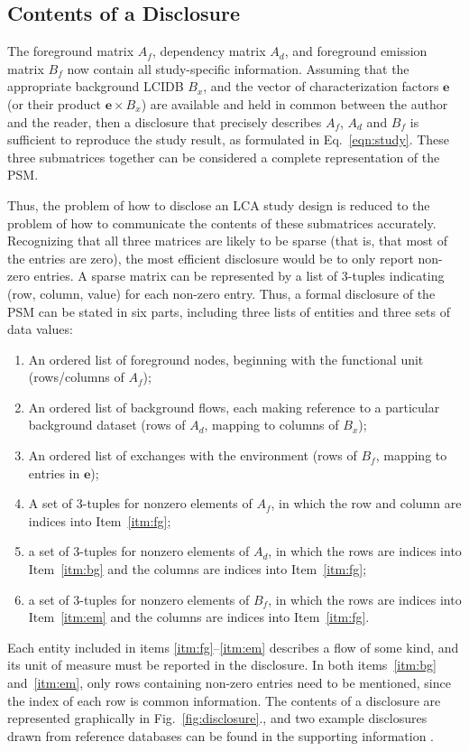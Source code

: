 \subsection{Contents of a Disclosure}

The foreground matrix $A_f$, dependency matrix $A_d$, and foreground emission matrix $B_f$ now contain all study-specific information.  Assuming that the appropriate background LCIDB $B_x$, and the vector of characterization factors $\mathbf{e}$ (or their product $\mathbf{e}\times B_x$) are available and held in common between the author and the reader, then a disclosure that precisely describes $A_f$, $A_d$ and $B_f$ is sufficient to reproduce the study result, as formulated in Eq.~\ref{eqn:study}.  These three submatrices together can be considered a complete representation of the PSM.


Thus, the problem of how to disclose an LCA study design is reduced to the problem of how to communicate the contents of these submatrices accurately.  Recognizing that all three matrices are likely to be sparse (that is, that most of the entries are zero), the most efficient disclosure would be to only report non-zero entries.  A sparse matrix can be represented by a list of 3-tuples indicating (row, column, value) for each non-zero entry.  Thus, a formal disclosure of the PSM can be stated in six parts, including three lists of entities and three sets of data values:
\begin{enumerate}[label={\em d-\roman*}., ref={\em d-\roman*}]
\item\label{itm:fg} An ordered list of foreground nodes, beginning with the functional unit (rows/columns of $A_f$);
\item\label{itm:bg} An ordered list of background flows, each making reference to a particular background dataset (rows of $A_d$, mapping to columns of $B_x$);
\item\label{itm:em} An ordered list of exchanges with the environment (rows of $B_f$, mapping to entries in $\mathbf{e}$);
\item\label{itm:af} A set of 3-tuples for nonzero elements of $A_f$, in which the row and column are indices into Item~\ref{itm:fg};
\item\label{itm:ad} a set of 3-tuples for nonzero elements of $A_d$, in which the rows are indices into Item~\ref{itm:bg} and the columns are indices into Item~\ref{itm:fg};
\item\label{itm:bf} a set of 3-tuples for nonzero elements of $B_f$, in which the rows are indices into Item~\ref{itm:em} and the columns are indices into Item~\ref{itm:fg}.
\end{enumerate}
Each entity included in items \ref{itm:fg}--\ref{itm:em} describes a flow of some kind, and its unit of measure must be reported in the disclosure.
In both items~\ref{itm:bg} and~\ref{itm:em}, only rows containing non-zero entries need to be mentioned, since the index of each row is common information.  The contents of a disclosure are represented graphically in Fig.~\ref{fig:disclosure}., and two example disclosures drawn from reference databases can be found in the supporting information .

